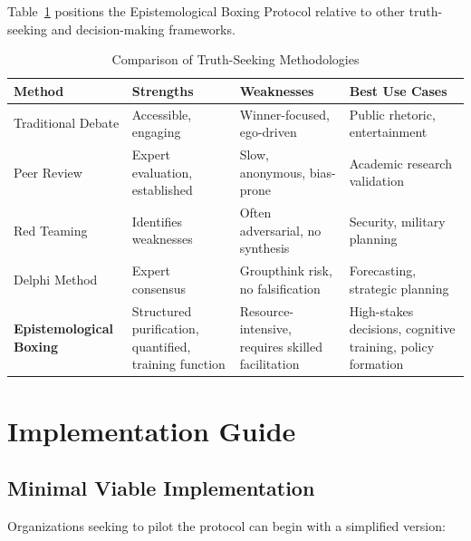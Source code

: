 \documentclass[11pt,a4paper]{article}
\begin{document}
Table~\ref{tab:methodology_comparison} positions the Epistemological Boxing Protocol relative to other truth-seeking and decision-making frameworks.

\begin{table}[htbp]
\centering
\caption{Comparison of Truth-Seeking Methodologies}
\label{tab:methodology_comparison}
\small
\begin{tabular}{@{}p{3cm}p{3cm}p{3cm}p{4.5cm}@{}}
\toprule
\textbf{Method} & \textbf{Strengths} & \textbf{Weaknesses} & \textbf{Best Use Cases} \\
\midrule
Traditional Debate & Accessible, engaging & Winner-focused, ego-driven & Public rhetoric, entertainment \\
\addlinespace
Peer Review & Expert evaluation, established & Slow, anonymous, bias-prone & Academic research validation \\
\addlinespace
Red Teaming & Identifies weaknesses & Often adversarial, no synthesis & Security, military planning \\
\addlinespace
Delphi Method & Expert consensus & Groupthink risk, no falsification & Forecasting, strategic planning \\
\addlinespace
\textbf{Epistemological Boxing} & Structured purification, quantified, training function & Resource-intensive, requires skilled facilitation & High-stakes decisions, cognitive training, policy formation \\
\bottomrule
\end{tabular}
\end{table}

\section{Implementation Guide}

\subsection{Minimal Viable Implementation}

Organizations seeking to pilot the protocol can begin with a simplified version:
\end{document}
